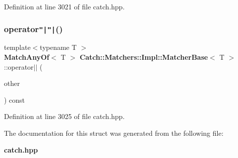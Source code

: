 Definition at line 3021 of file catch.\+hpp.

\mbox{\label{struct_catch_1_1_matchers_1_1_impl_1_1_matcher_base_a5f8542b8f1567a6f9c65d0a6da7b679b}} 
\subsubsection{operator\texttt{"|}\texttt{"|}()}
{\footnotesize\ttfamily template$<$typename T $>$ \\
\textbf{ Match\+Any\+Of}$<$ T $>$ \textbf{ Catch\+::\+Matchers\+::\+Impl\+::\+Matcher\+Base}$<$ T $>$\+::operator$\vert$$\vert$ (\begin{DoxyParamCaption}\item[{\textbf{ Matcher\+Base}$<$ T $>$ const \&}]{other }\end{DoxyParamCaption}) const}



Definition at line 3025 of file catch.\+hpp.



The documentation for this struct was generated from the following file\+:\begin{DoxyCompactItemize}
\item 
\textbf{ catch.\+hpp}\end{DoxyCompactItemize}
